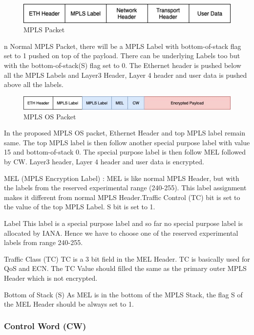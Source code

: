 \begin{figure}
       \centering\includegraphics[width=\textwidth]{Final/MPLS.png}
       \caption{MPLS Packet}
       \label{fig:compbest}
\end{figure}


n Normal MPLS Packet, there will be a MPLS Label with bottom-of-stack flag set to 1 pushed on top of the payload. There can be underlying Labels too but with the bottom-of-stack(S) flag set to 
0. The Ethernet header is pushed below all the MPLS Labels and Layer3 Header, Layer 4 header and user data is pushed above all the labels.

\begin{figure}
       \centering\includegraphics[width=\textwidth]{Final/MPLSOS Packet.jpg}
       \caption{MPLS OS Packet}
       \label{fig:compbest}
\end{figure}


 In the proposed MPLS OS packet, Ethernet Header and top MPLS label remain same. The top MPLS label is then follow another special purpose label with value 15 and bottom-of-stack 0. The special purpose label is then follow MEL followed by CW. Layer3 header, Layer 4 header and user data is encrypted. 

MEL (MPLS Encryption Label) : MEL is like normal MPLS Header, but with the labels from the reserved experimental range (240-255). This label assignment makes it different from normal MPLS Header.Traffic Control (TC) bit is set to the value of the top MPLS Label. S bit is set to 1.

Label 
This label is a special purpose label and so far no special purpose label is allocated by IANA. Hence we have to choose one of the reserved experimental labels from range 240-255.

Traffic Class (TC)
TC is a 3 bit field in the MEL Header. TC is basically used for QoS and ECN. The TC Value should filled the same as the primary outer MPLS Header which is not encrypted.

Bottom of Stack (S)
As MEL is in the bottom of the MPLS Stack, the flag S of the MEL Header should be always set to 1. 

\subsubsection{Control Word (CW)}

